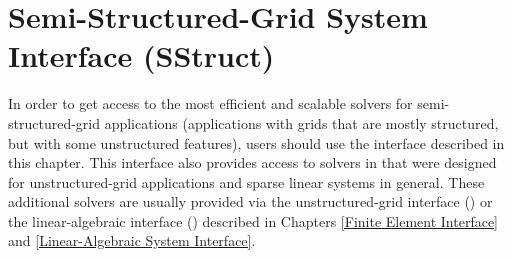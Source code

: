 \chapter{Semi-Structured-Grid System Interface (SStruct)}
\label{Semi-Structured-Grid System Interface}

In order to get access to the most efficient and scalable solvers for
semi-structured-grid applications (applications with grids that are
mostly structured, but with some unstructured features), users should
use the  interface described in this chapter.  This
interface also provides access to solvers in \hypre{} that were
designed for unstructured-grid applications and sparse linear systems
in general.  These additional solvers are usually provided via the
unstructured-grid interface () or the linear-algebraic
interface () described in Chapters
\ref{Finite Element Interface} and \ref{Linear-Algebraic System Interface}.

